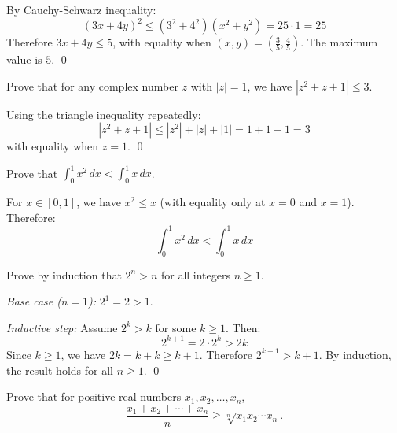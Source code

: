 \documentclass[12pt]{article}
\begin{document}
\begin{solution}
By Cauchy-Schwarz inequality:
\[
(3x + 4y)^2 \le (3^2 + 4^2)(x^2 + y^2) = 25 \cdot 1 = 25
\]
Therefore $3x + 4y \le 5$, with equality when $(x, y) = \left(\frac{3}{5}, \frac{4}{5}\right)$. The maximum value is $5$. \qed
\end{solution}

\begin{examplebox}[title={\bfseries Example~\thetcbcounter: Triangle Inequality}]
Prove that for any complex number $z$ with $|z| = 1$, we have $|z^2 + z + 1| \le 3$.

\end{examplebox}

\begin{solution}
Using the triangle inequality repeatedly:
\[
|z^2 + z + 1| \le |z^2| + |z| + |1| = 1 + 1 + 1 = 3
\]
with equality when $z = 1$. \qed
\end{solution}

\begin{examplebox}[title={\bfseries Example~\thetcbcounter: Integration Inequality}]
Prove that $\displaystyle\int_0^1 x^2 \, dx < \int_0^1 x \, dx$.

\end{examplebox}

\begin{solution}
For $x \in [0, 1]$, we have $x^2 \le x$ (with equality only at $x = 0$ and $x = 1$). Therefore:
\[
\int_0^1 x^2 \, dx < \int_0^1 x \, dx
\]
\end{solution}

\begin{examplebox}[title={\bfseries Example~\thetcbcounter: Induction with Inequality}]
Prove by induction that $2^n > n$ for all integers $n \ge 1$.

\end{examplebox}

\begin{solution}
  \textit{Base case ($n = 1$):} $2^1 = 2 > 1$. \checkmark

  \textit{Inductive step:} Assume $2^k > k$ for some $k \ge 1$. Then:
\[
2^{k+1} = 2 \cdot 2^k > 2k
\]
Since $k \ge 1$, we have $2k = k + k \ge k + 1$. Therefore $2^{k+1} > k + 1$. By induction, the result holds for all $n \ge 1$. \qed
\end{solution}

\begin{examplebox}[title={\bfseries Example~\thetcbcounter: AM-GM via Jensen}]
Prove that for positive real numbers $x_1, x_2, \ldots, x_n$,
\[
  \frac{x_1 + x_2 + \cdots + x_n}{n} \ge \sqrt[n]{x_1 x_2 \cdots x_n}.
\]

\end{examplebox}
\end{document}
